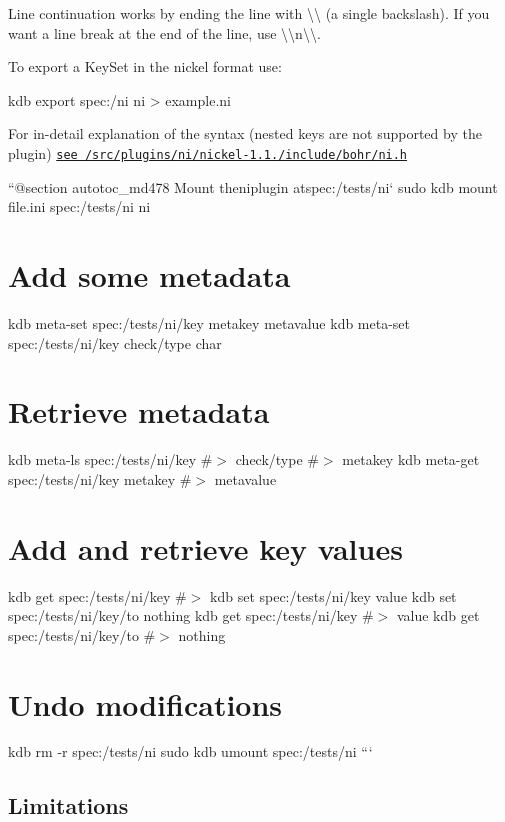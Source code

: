 Line continuation works by ending the line with {\ttfamily \textbackslash{}\textbackslash{}} (a single backslash). If you want a line break at the end of the line, use {\ttfamily \textbackslash{}\textbackslash{}n\textbackslash{}\textbackslash{}}.

To export a {\ttfamily Key\+Set} in the nickel format use\+:


\begin{DoxyCode}
kdb export spec:/ni ni > example.ni
\end{DoxyCode}


For in-\/detail explanation of the syntax (nested keys are not supported by the plugin) \href{/home/jenkins/workspace/libelektra-release/src/plugins/ni/nickel-1.1.0/include/bohr/ni.h}{\tt see /src/plugins/ni/nickel-\/1.1./include/bohr/ni.h}

``{\ttfamily  @section autotoc\+\_\+md478 Mount the}ni{\ttfamily plugin at}spec\+:/tests/ni` sudo kdb mount file.\+ini spec\+:/tests/ni ni\hypertarget{autotoc_md475_autotoc_md479}{}\section{Add some metadata}\label{autotoc_md475_autotoc_md479}
kdb meta-\/set spec\+:/tests/ni/key metakey metavalue kdb meta-\/set spec\+:/tests/ni/key check/type char\hypertarget{autotoc_md475_autotoc_md480}{}\section{Retrieve metadata}\label{autotoc_md475_autotoc_md480}
kdb meta-\/ls spec\+:/tests/ni/key \#$>$ check/type \#$>$ metakey kdb meta-\/get spec\+:/tests/ni/key metakey \#$>$ metavalue\hypertarget{autotoc_md475_autotoc_md481}{}\section{Add and retrieve key values}\label{autotoc_md475_autotoc_md481}
kdb get spec\+:/tests/ni/key \#$>$ kdb set spec\+:/tests/ni/key value kdb set spec\+:/tests/ni/key/to nothing kdb get spec\+:/tests/ni/key \#$>$ value kdb get spec\+:/tests/ni/key/to \#$>$ nothing\hypertarget{autotoc_md475_autotoc_md482}{}\section{Undo modifications}\label{autotoc_md475_autotoc_md482}
kdb rm -\/r spec\+:/tests/ni sudo kdb umount spec\+:/tests/ni ```\hypertarget{autotoc_md475_autotoc_md483}{}\subsection{Limitations}\label{autotoc_md475_autotoc_md483}

